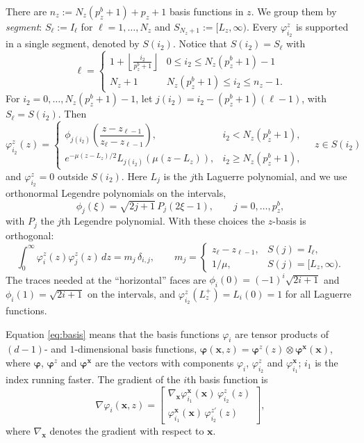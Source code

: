 \documentclass[11pt]{article}
\newcommand{\bx}{\mathbf{x}}
\begin{document}
	There are $n_z:=N_z(p^b_z+1)+p_z+1$ basis functions in $z$. We group them by \emph{segment}: $S_\ell:=I_\ell$ for $\ell=1,\dots,N_z$ and $S_{N_z+1}:=[L_z,\infty)$. Every $\varphi^z_{i_2}$ is supported in a single segment, denoted by $S(i_2)$. Notice that $S(i_2)=S_\ell$ with
	\begin{equation*}
		\ell = \begin{cases}
			1+\left\lfloor\frac{i_2}{p_z^b+1}\right\rfloor & 0\leq i_2 \leq N_z(p_z^b+1)-1 \\
			N_z+1 & N_z(p_z^b+1)\leq i_2\leq n_z-1.
		\end{cases}
	\end{equation*}
	 For $i_2=0,\dots,N_z(p^b_z+1)-1$, let $j(i_2) = i_2-(p_z^b+1)(\ell-1)$, with $S_\ell=S(i_2)$. Then
	\[
	\varphi^z_{i_2}(z)=
	\begin{cases}
		\phi_{j(i_2)}\!\left(\dfrac{z-z_{\ell-1}}{z_{\ell}-z_{\ell-1}}\right), &  i_2<N_z(p^b_z+1),\\[1em]
		e^{-\mu(z-L_z)/2}L_{j(i_2)}(\mu(z-L_z)), & i_2\ge N_z(p^b_z+1),
	\end{cases} \quad z\in S(i_2)
	\]
	and $\varphi^z_{i_2}=0$ outside $S(i_2)$. Here $L_j$ is the $j$th Laguerre polynomial, and we use orthonormal Legendre polynomials on the intervals,
	\[
	\phi_j(\xi)=\sqrt{2j+1}\,P_j(2\xi-1),\qquad j=0,\dots,p^b_z,
	\]
	with $P_j$ the $j$th Legendre polynomial. With these choices the $z$-basis is orthogonal:
	\begin{equation}\label{eq:massz}
		\int_0^\infty\varphi^z_i(z)\varphi^z_j(z)\,dz=m_j\,\delta_{i,j},\qquad
		m_j=\begin{cases} z_\ell-z_{\ell-1}, & S(j)=I_\ell,\\ 1/\mu, & S(j)=[L_z,\infty).\end{cases}
	\end{equation}
	The traces needed at the ``horizontal'' faces are $\phi_i(0)=(-1)^i\sqrt{2i+1}$ and $\phi_i(1)=\sqrt{2i+1}$ on the intervals, and $\varphi^z_{i_2}(L_z^+)=L_i(0)=1$ for all Laguerre functions.
	
	Equation \eqref{eq:basis} means that the basis functions $\varphi_i$ are tensor products of $(d-1)$- and $1$-dimensional basis functions, $\bm{\varphi}(\bx,z)=\bm{\varphi}^z(z)\otimes\bm{\varphi}^\bx(\bx)$, where $\bm{\varphi}$, $\bm{\varphi}^z$ and $\bm{\varphi}^\bx$ are the vectors with components $\varphi_i$, $\varphi^z_{i_2}$ and $\varphi^\bx_{i_1}$; $i_1$ is the index running faster. The gradient of the $i$th basis function is
	\begin{equation}\label{eq:grad}
		\nabla\varphi_i(\bx,z)=\begin{bmatrix}\nabla_\bx\varphi^\bx_{i_1}(\bx)\,\varphi^z_{i_2}(z)\\ \varphi^\bx_{i_1}(\bx)\,\varphi^{z\prime}_{i_2}(z)\end{bmatrix},
	\end{equation}
	where $\nabla_\bx$ denotes the gradient with respect to $\bx$.
	
\end{document}
